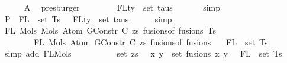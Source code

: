 \begin{isabellebody}
\ \ \ \ \isamarkupfalse%
\ A{}\ \isamarkupfalse%
\ presburger\isanewline
\ \ \isamarkupfalse%
\ \isamarkupfalse%
\ {\isachardoublequoteopen}{\isachardot}{\kern0pt}{\isachardot}{\kern0pt}{\isachardot}{\kern0pt}\ {\isacharequal}{\kern0pt}\ {\isasymUnion}\ {\isacharparenleft}{\kern0pt}FLty\ {\isacharbackquote}{\kern0pt}\ set\ taus{\isacharparenright}{\kern0pt}{\isachardoublequoteclose}\isanewline
\ \ \ \ \ \isamarkupfalse%
\ simp\isanewline
\ \ \isamarkupfalse%
\ \isamarkupfalse%
\ P{}{\isacharcolon}{\kern0pt}\ {\isachardoublequoteopen}{\isasymUnion}\ {\isacharparenleft}{\kern0pt}FL\ {\isacharbackquote}{\kern0pt}\ set\ Ts{\isacharparenright}{\kern0pt}\ {\isacharequal}{\kern0pt}\ {\isasymUnion}\ {\isacharparenleft}{\kern0pt}FLty\ {\isacharbackquote}{\kern0pt}\ set\ taus{\isacharparenright}{\kern0pt}{\isachardoublequoteclose}\isanewline
\ \ \ \ \isamarkupfalse%
\ simp\isanewline
\isanewline
\ \ \isamarkupfalse%
\ {\isachardoublequoteopen}FL\ {\isacharparenleft}{\kern0pt}Mols{}\ {\isacharparenleft}{\kern0pt}Mols{}\ {\isacharparenleft}{\kern0pt}Atom\ {\isacharparenleft}{\kern0pt}GConstr\ C{\isacharparenright}{\kern0pt}\ zs{\isacharparenright}{\kern0pt}\ {\isacharparenleft}{\kern0pt}fusions{\isacharunderscore}{\kern0pt}of\ fusions{\isacharparenright}{\kern0pt}{\isacharparenright}{\kern0pt}\ Ts{\isacharparenright}{\kern0pt}\ {\isacharequal}{\kern0pt}\isanewline
\ \ \ \ \ \ \ \ FL\ {\isacharparenleft}{\kern0pt}Mols{}\ {\isacharparenleft}{\kern0pt}Atom\ {\isacharparenleft}{\kern0pt}GConstr\ C{\isacharparenright}{\kern0pt}\ zs{\isacharparenright}{\kern0pt}\ {\isacharparenleft}{\kern0pt}fusions{\isacharunderscore}{\kern0pt}of\ fusions{\isacharparenright}{\kern0pt}{\isacharparenright}{\kern0pt}\isanewline
\ {\isasymunion}\ {\isasymUnion}\ {\isacharparenleft}{\kern0pt}FL\ {\isacharbackquote}{\kern0pt}\ set\ {\isacharparenleft}{\kern0pt}Ts{\isacharparenright}{\kern0pt}{\isacharparenright}{\kern0pt}{\isachardoublequoteclose}\isanewline
\ \ \ \ \isamarkupfalse%
\ {\isacharparenleft}{\kern0pt}simp\ add{\isacharcolon}{\kern0pt}\ FL{\isacharunderscore}{\kern0pt}Mols{}{\isacharparenright}{\kern0pt}\isanewline
\ \ \isamarkupfalse%
\ \isamarkupfalse%
\isanewline
\ \ \ \ {\isachardoublequoteopen}{\isachardot}{\kern0pt}{\isachardot}{\kern0pt}{\isachardot}{\kern0pt}\ {\isacharequal}{\kern0pt}\ {\isacharparenleft}{\kern0pt}set\ zs\ {\isasymunion}\ {\isacharparenleft}{\kern0pt}{\isasymUnion}\ {\isacharparenleft}{\kern0pt}x{\isacharcomma}{\kern0pt}\ y{\isacharparenright}{\kern0pt}\ {\isasymin}\ set\ fusions{\isachardot}{\kern0pt}\ {\isacharbraceleft}{\kern0pt}x{\isacharcomma}{\kern0pt}\ y{\isacharbraceright}{\kern0pt}{\isacharparenright}{\kern0pt}{\isacharparenright}{\kern0pt}\ {\isasymunion}\ {\isasymUnion}\ {\isacharparenleft}{\kern0pt}FL\ {\isacharbackquote}{\kern0pt}\ set\ Ts{\isacharparenright}{\kern0pt}{\isachardoublequoteclose}\isanewline

\end{isabellebody}
